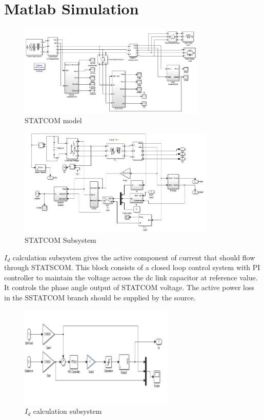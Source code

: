\documentclass[journal,twoside]{IEEEtran}
\begin{document}
\section{Matlab Simulation}
\begin{figure}[!ht]
\includegraphics[width=3.5in]{2}
\caption{STATCOM model}
\label{f2}
\end{figure}

\begin{figure}[!ht]
\includegraphics[width=3.7in]{3}
\caption{STATCOM Subsystem}
\label{f3}
\end{figure}
$I_d$ calculation subsystem gives the active
component of current that should flow through
STATSCOM. This block consists of a closed loop
control system with PI controller to maintain the
voltage across the dc link capacitor at reference
value. It controls the phase angle output of
STATCOM voltage. The active power loss in the
SSTATCOM branch should be supplied by the
source.
\begin{figure}[!ht]
\includegraphics[width=2.9in]{4}
\caption{$I_d$ calculation subsystem}
\label{f4}
\end{figure}
\end{document}
